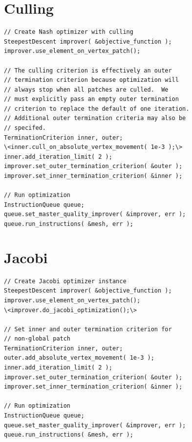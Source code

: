 \section{Culling \label{sec:culling}}


\begin{lstlisting}[frame=single]
// Create Nash optimizer with culling
SteepestDescent improver( &objective_function );
improver.use_element_on_vertex_patch();

// The culling criterion is effectively an outer 
// termination criterion because optimization will 
// always stop when all patches are culled.  We 
// must explicitly pass an empty outer termination 
// criterion to replace the default of one iteration.
// Additional outer termination criteria may also be 
// specifed.
TerminationCriterion inner, outer;
\<inner.cull_on_absolute_vertex_movement( 1e-3 );\>
inner.add_iteration_limit( 2 );
improver.set_outer_termination_criterion( &outer );
improver.set_inner_termination_criterion( &inner );

// Run optimization
InstructionQueue queue;
queue.set_master_quality_improver( &improver, err );
queue.run_instructions( &mesh, err );
\end{lstlisting}

\section{Jacobi \label{sec:jacobi}}

\begin{lstlisting}[frame=single]
// Create Jacobi optimizer instance
SteepestDescent improver( &objective_function );
improver.use_element_on_vertex_patch();
\<improver.do_jacobi_optimization();\>

// Set inner and outer termination criterion for 
// non-global patch
TerminationCriterion inner, outer;
outer.add_absolute_vertex_movement( 1e-3 );
inner.add_iteration_limit( 2 );
improver.set_outer_termination_criterion( &outer );
improver.set_inner_termination_criterion( &inner );

// Run optimization
InstructionQueue queue;
queue.set_master_quality_improver( &improver, err );
queue.run_instructions( &mesh, err );
\end{lstlisting}

